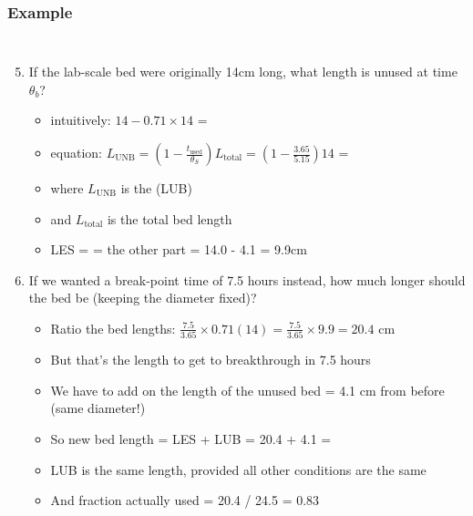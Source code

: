 \begin{frame}\frametitle{Example}
	\vspace{-12pt}
	\begin{columns}[t]
		\begin{enumerate}
			\setcounter{enumi}{4}
			\item	If the lab-scale bed were originally 14cm long, what length is unused at time $\theta_b$?
				\begin{itemize}
					\item	intuitively: $14 - 0.71 \times 14$ = {\color{myOrange}{4.1 cm}}
					\item	equation: $L_\text{UNB} = \left(1 - \displaystyle\frac{t_\text{used}}{\theta_S} \right)L_\text{total} = \left(1 - \displaystyle\frac{3.65}{5.15} \right)14$ = {\color{myOrange}{4.1 cm}}
					\item	where $L_\text{UNB}$ is the {\color{purple}{length of the unused bed}} (LUB)
					\item	and $L_\text{total}$ is the total bed length
					\item	LES = {\color{purple}{length of equilibrium section}} = the other part = 14.0 - 4.1 = 9.9cm
					
				\end{itemize}
			\vspace{6pt}
			\pause
			\item	If we wanted a break-point time of 7.5 hours instead, how much longer should the bed be (keeping the diameter fixed)?
			\begin{itemize}
				\item	Ratio the bed lengths: $\displaystyle \frac{7.5}{3.65} \times 0.71(14) = \frac{7.5}{3.65} \times 9.9 = 20.4$ cm
				\item	But that's the length to get to breakthrough in 7.5 hours
				\item	We have to add on the length of the unused bed = 4.1 cm from before (same diameter!)
				\item	So new bed length = LES + LUB = 20.4 + 4.1  = {\color{myOrange}{24.5 cm}}
				\item	LUB is the same length, provided all other conditions are the same
				\item	And fraction actually used = 20.4 / 24.5 = 0.83
			\end{itemize}
		\end{enumerate}
	\end{columns}	
\end{frame}


